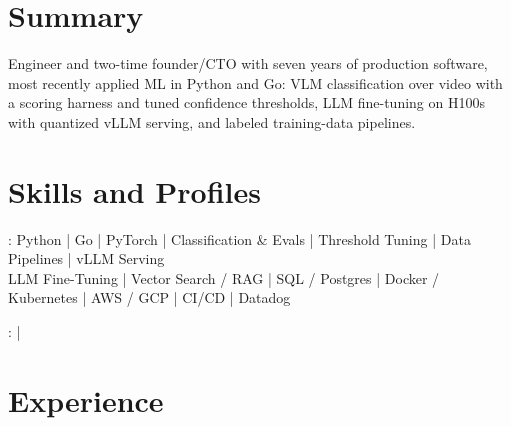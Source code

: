 \documentclass[print]{jack-resume}
\begin{document}
\pagecolor{darkmodeBackground}


\begin{minipage}[t][1cm][t]{.03\textwidth}
    \hfill
\end{minipage}

\section{Summary}
Engineer and two-time founder/CTO with seven years of production software, most recently applied ML in Python and Go: VLM classification over video with a scoring harness and tuned confidence thresholds, LLM fine-tuning on H100s with quantized vLLM serving, and labeled training-data pipelines.
\sectionsep

\section{Skills and Profiles}
:
Python \hfill | \hfill
Go \hfill | \hfill
PyTorch \hfill | \hfill
Classification \& Evals \hfill | \hfill
Threshold Tuning \hfill | \hfill
Data Pipelines \hfill | \hfill
vLLM Serving \\
\hspace{1.0cm} LLM Fine-Tuning \hfill | \hfill
Vector Search / RAG \hfill | \hfill
SQL / Postgres \hfill | \hfill
Docker / Kubernetes \hfill | \hfill
AWS / GCP \hfill | \hfill
CI/CD \hfill | \hfill
Datadog \\

\raggedright{
    :
      \href{https://www.linkedin.com/in/jack-sturtevant/}{ \ExternalLink} |
     \href{https://github.com/jacksturt}{ \ExternalLink}}

\section{Experience}
\end{document}
